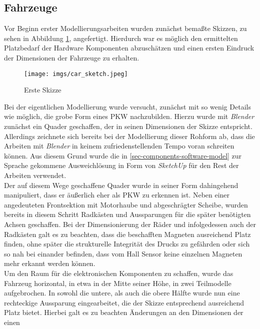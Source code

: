 \documentclass[.../Dokumentation.tex]{subfiles}
\begin{document}
\subsection{Fahrzeuge}\label{sec-ita1-cars}
Vor Beginn erster Modellierungsarbeiten wurden zunächst bemaßte Skizzen, 
zu sehen in Abbildung \ref{fig-car-sketch}, angefertigt. 
Hierdurch war es möglich den ermittelten Platzbedarf der Hardware 
Komponenten abzuschätzen und einen ersten Eindruck der Dimensionen der 
Fahrzeuge zu erhalten.\\
\begin{figure}[H]
    \begin{center}
    \texttt{[image: imgs/car\_sketch.jpeg]}
    \caption{Erste Skizze}
    \label{fig-car-sketch}
\end{center}
\end{figure}
\noindent
Bei der eigentlichen Modellierung wurde versucht, zunächst mit so wenig 
Details wie möglich, die grobe Form eines PKW nachzubilden. Hierzu wurde mit 
\textit{Blender} zunächst ein Quader geschaffen, der in seinen Dimensionen 
der Skizze entspricht.\\
Allerdings zeichnete sich bereits bei der Modellierung dieser Rohform ab, 
dass die Arbeiten mit \textit{Blender} in keinem zufriedenstellenden Tempo 
voran schreiten können. Aus diesem Grund wurde die in 
\ref{sec-components-software-model} zur Sprache gekommene Ausweichlösung in 
Form von \textit{SketchUp} für den Rest der Arbeiten verwendet.\\
Der auf diesem Wege geschaffene Quader wurde in seiner Form dahingehend 
manipuliert, dass er äußerlich eher als PKW zu erkennen ist. 
Neben einer angedeuteten Frontsektion mit Motorhaube und abgeschrägter Scheibe, 
wurden bereits in diesem Schritt Radkästen und Aussparungen für die später 
benötigten Achsen geschaffen. 
Bei der Dimensionierung der Räder und infolgedessen auch der Radkästen galt 
es zu beachten, dass die beschafften Magneten ausreichend Platz finden, 
ohne später die strukturelle Integrität des Drucks zu gefährden oder sich so 
nah bei einander befinden, dass vom Hall Sensor keine einzelnen Magneten 
mehr erkannt werden können.\\
Um den Raum für die elektronischen Komponenten zu schaffen, wurde das Fahrzeug 
horizontal, in etwa in der Mitte seiner Höhe, in zwei Teilmodelle aufgebrochen.
In sowohl die untere, als auch die obere Hälfte wurde nun eine rechteckige 
Aussparung eingearbeitet, die der Skizze entsprechend ausreichend Platz bietet.
Hierbei galt es zu beachten Änderungen an den Dimensionen der einen 
\end{document}
